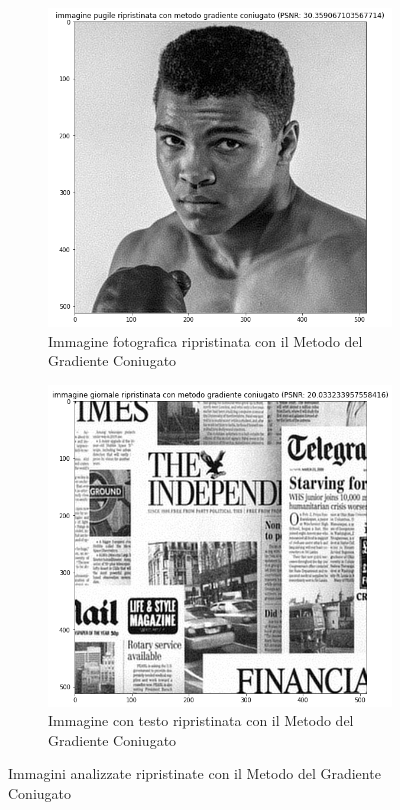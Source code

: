 \begin{figure}[H]
  \begin{subfigure}{0.5\textwidth}
    \centering
    \includegraphics[width=\textwidth]{imgRel/pugilemgc.png}
    \caption{Immagine fotografica ripristinata con il Metodo del Gradiente Coniugato}
  \end{subfigure}\hfill
  \begin{subfigure}{0.5\textwidth}
    \includegraphics[width=\textwidth]{imgRel/giornalemgc.png}
    \caption{Immagine con testo ripristinata con il Metodo del Gradiente Coniugato}
  \end{subfigure}
  \caption{Immagini analizzate ripristinate con il Metodo del Gradiente Coniugato}


\end{figure}
